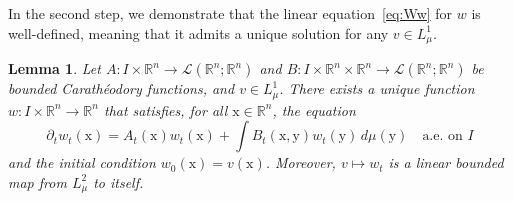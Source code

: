 \documentclass[sn-mathphys-num]{sn-jnl}
\numberwithin{equation}{section}
\theoremstyle{mythm}
\newtheorem{lemma}[proposition]{Lemma}
\theoremstyle{mydef}
\renewcommand{\d}{\,d}
\begin{document}
In the second step, we demonstrate that the linear equation~\eqref{eq:Ww} for \( w \) is well-defined, meaning that it admits a unique solution for any \( v \in L^1_{\mu} \).
\begin{lemma}
  \label{lem:s1}
  Let \( A \colon I \times \mathbb{R}^n \to \mathcal{L}(\mathbb{R}^n;\mathbb{R}^n) \) and \( B\colon I \times \mathbb{R}^n \times \mathbb{R}^n \to \mathcal{L}(\mathbb{R}^n;\mathbb{R}^n) \) be bounded Carath\'eodory functions, and \( v\in L^1_{\mu} \).
  There exists a unique function \( w\colon I \times \mathbb{R}^n\to \mathbb{R}^n \) that satisfies, for all \( \mathrm{x}\in \mathbb{R}^n \), the equation
  \begin{equation}
    \label{eq:Alin}
    \partial_t w_t(\mathrm{x}) = A_t(\mathrm{x}) w_t(\mathrm{x}) + \int B_t(\mathrm{x},\mathrm{y}) w_t(\mathrm{y})\d \mu(\mathrm{y})\quad \text{a.e. on } I
  \end{equation}
  and the initial condition \( w_{0}(\mathrm{x}) = v(\mathrm{x}) \).
  Moreover, \( v \mapsto w_t \) is a linear bounded map from \( {L}^2_{\mu} \) to itself.
\end{lemma}
\end{document}
